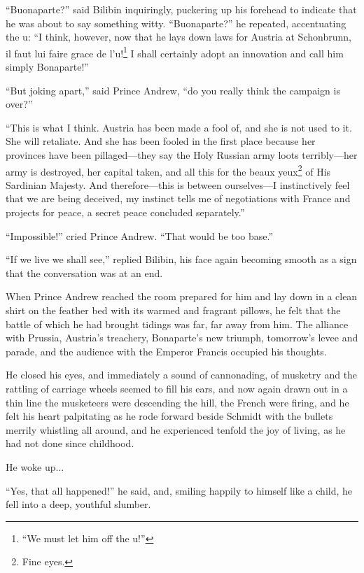 ``Buonaparte?'' said Bilibin inquiringly, puckering up his
forehead to indicate that he was about to say something
witty. ``Buonaparte?'' he repeated, accentuating the u: ``I
think, however, now that he lays down laws for Austria at
Schonbrunn, il faut lui faire grace de l'u!\footnote{``We must
let him off the u!''} I shall certainly adopt an innovation and
call him simply Bonaparte!''

``But joking apart,'' said Prince Andrew, ``do you really think
the campaign is over?''

``This is what I think. Austria has been made a fool of, and she
is not used to it. She will retaliate. And she has been fooled in
the first place because her provinces have been pillaged---they
say the Holy Russian army loots terribly---her army is destroyed,
her capital taken, and all this for the beaux yeux\footnote{Fine
eyes.} of His Sardinian Majesty. And therefore---this is between
ourselves---I instinctively feel that we are being deceived, my
instinct tells me of negotiations with France and projects for
peace, a secret peace concluded separately.''

``Impossible!'' cried Prince Andrew. ``That would be too base.''

``If we live we shall see,'' replied Bilibin, his face again
becoming smooth as a sign that the conversation was at an end.

When Prince Andrew reached the room prepared for him and lay down
in a clean shirt on the feather bed with its warmed and fragrant
pillows, he felt that the battle of which he had brought tidings
was far, far away from him. The alliance with Prussia, Austria's
treachery, Bonaparte's new triumph, tomorrow's levee and parade,
and the audience with the Emperor Francis occupied his thoughts.

He closed his eyes, and immediately a sound of cannonading, of
musketry and the rattling of carriage wheels seemed to fill his
ears, and now again drawn out in a thin line the musketeers were
descending the hill, the French were firing, and he felt his
heart palpitating as he rode forward beside Schmidt with the
bullets merrily whistling all around, and he experienced tenfold
the joy of living, as he had not done since childhood.

He woke up...

``Yes, that all happened!'' he said, and, smiling happily to
himself like a child, he fell into a deep, youthful slumber.


